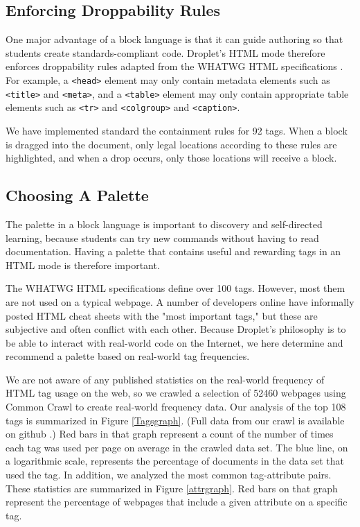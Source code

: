 \documentclass[conference]{IEEEtran}
\begin{document}
\subsection{Enforcing Droppability Rules}

One major advantage of a block language is that it can guide authoring so that students create standards-compliant code. Droplet's HTML mode therefore enforces droppability rules adapted from the WHATWG HTML specifications \cite{WHATWG}.  For example, a \texttt{<head>} element may only contain metadata elements such as \texttt{<title>} and \texttt{<meta>}, and a \texttt{<table>} element may only contain appropriate table elements such as \texttt{<tr>} and \texttt{<colgroup>} and \texttt{<caption>}.

We have implemented standard the containment rules for 92 tags.  When a block is dragged into the document, only legal locations according to these rules are highlighted, and when a drop occurs, only those locations will receive a block.

\subsection{Choosing A Palette}

The palette in a block language is important to discovery and self-directed learning, because students can try new commands without having to read documentation. Having a palette that contains useful and rewarding tags in an HTML mode is therefore important.

The WHATWG HTML specifications define over 100 tags. However, most them are not used on a typical webpage. A number of developers online have informally posted HTML cheat sheets with the "most important tags," \cite{Webmonkey} \cite{SimpleGuide} \cite{Usabilla} but these are subjective and often conflict with each other. Because Droplet's philosophy is to be able to interact with real-world code on the Internet, we here determine and recommend a palette based on real-world tag frequencies.

We are not aware of any published statistics on the real-world frequency of HTML tag usage on the web, so we crawled a selection of 52460 webpages using Common Crawl \cite{commoncrawl} to create real-world frequency data. Our analysis of the top 108 tags is summarized in Figure \ref{Tagsgraph}.  (Full data from our crawl is available on github \cite{FullResults}.)  Red bars in that graph represent a count of the number of times each tag was used per page on average in the crawled data set.  The blue line, on a logarithmic scale, represents the percentage of documents in the data set that used the tag.  In addition, we analyzed the most common tag-attribute pairs.  These statistics are summarized in Figure \ref{attrgraph}.  Red bars on that graph represent the percentage of webpages that include a given attribute on a specific tag.
\end{document}
